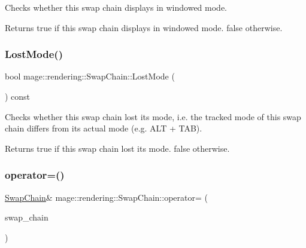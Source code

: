 Checks whether this swap chain displays in windowed mode.

\begin{DoxyReturn}{Returns}
{\ttfamily true} if this swap chain displays in windowed mode. {\ttfamily false} otherwise. 
\end{DoxyReturn}
\hypertarget{classmage_1_1rendering_1_1_swap_chain_a8d4356d1652fca65095bc4db2bd0c1f2}{}\label{classmage_1_1rendering_1_1_swap_chain_a8d4356d1652fca65095bc4db2bd0c1f2} 
\subsubsection{\texorpdfstring{Lost\+Mode()}{LostMode()}}
{\footnotesize\ttfamily bool mage\+::rendering\+::\+Swap\+Chain\+::\+Lost\+Mode (\begin{DoxyParamCaption}{ }\end{DoxyParamCaption}) const\hspace{0.3cm}{\ttfamily [noexcept]}}

Checks whether this swap chain lost its mode, i.\+e. the tracked mode of this swap chain differs from its actual mode (e.\+g. A\+LT + T\+AB).

\begin{DoxyReturn}{Returns}
{\ttfamily true} if this swap chain lost its mode. {\ttfamily false} otherwise. 
\end{DoxyReturn}
\hypertarget{classmage_1_1rendering_1_1_swap_chain_a44dfcabbd320aad76853522bd084d181}{}\label{classmage_1_1rendering_1_1_swap_chain_a44dfcabbd320aad76853522bd084d181} 
\subsubsection{\texorpdfstring{operator=()}{operator=()}\hspace{0.1cm}{\footnotesize\ttfamily [1/2]}}
{\footnotesize\ttfamily \hyperlink{classmage_1_1rendering_1_1_swap_chain}{Swap\+Chain}\& mage\+::rendering\+::\+Swap\+Chain\+::operator= (\begin{DoxyParamCaption}\item[{const \hyperlink{classmage_1_1rendering_1_1_swap_chain}{Swap\+Chain} \&}]{swap\+\_\+chain }\end{DoxyParamCaption})\hspace{0.3cm}{\ttfamily [delete]}}

